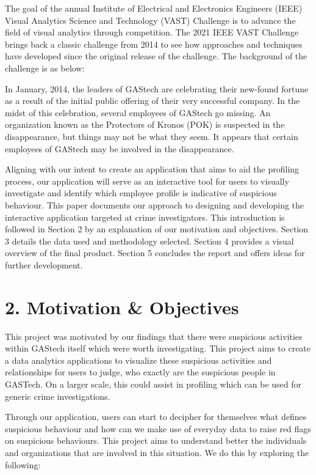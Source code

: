 \documentclass[
]{article}
\begin{document}
The goal of the annual Institute of Electrical and Electronics Engineers (IEEE) Visual Analytics Science and Technology (VAST) Challenge is to advance the field of visual analytics through competition. The 2021 IEEE VAST Challenge brings back a classic challenge from 2014 to see how approaches and techniques have developed since the original release of the challenge. The background of the challenge is as below:

In January, 2014, the leaders of GAStech are celebrating their new-found fortune as a result of the initial public offering of their very successful company. In the midst of this celebration, several employees of GAStech go missing. An organization known as the Protectors of Kronos (POK) is suspected in the disappearance, but things may not be what they seem. It appears that certain employees of GAStech may be involved in the disappearance.

Aligning with our intent to create an application that aims to aid the profiling process, our application will serve as an interactive tool for users to visually investigate and identify which employee profile is indicative of suspicious behaviour. This paper documents our approach to designing and developing the interactive application targeted at crime investigators. This introduction is followed in Section 2 by an explanation of our motivation and objectives. Section 3 details the data used and methodology selected. Section 4 provides a visual overview of the final product. Section 5 concludes the report and offers ideas for further development.

\hypertarget{motivation-objectives}{%
\section{2. Motivation \& Objectives}\label{motivation-objectives}}

This project was motivated by our findings that there were suspicious activities within GAStech itself which were worth investigating. This project aims to create a data analytics applications to visualize these suspicious activities and relationships for users to judge, who exactly are the suspicious people in GASTech. On a larger scale, this could assist in profiling which can be used for generic crime investigations.

Through our application, users can start to decipher for themselves what defines suspicious behaviour and how can we make use of everyday data to raise red flags on suspicious behaviours. This project aims to understand better the individuals and organizations that are involved in this situation. We do this by exploring the following:
\end{document}
